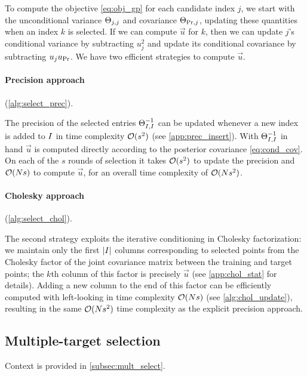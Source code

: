 \documentclass[review,supplement,onefignum,onetabnum]{siamonline220329}
\begin{document}
To compute the objective \cref{eq:obj_gp} for each candidate index \( j \),
we start with the unconditional variance \( \Theta_{j, j} \) and covariance \(
\Theta_{\text{Pr}, j} \), updating these quantities when an index \( k \) is selected.
If we can compute \( \vec{u} \) for \( k \), then we can update
\( j \)'s conditional variance by subtracting \( u_j^2 \) and
update its conditional covariance by subtracting \( u_j u_{\text{Pr}} \).
We have two efficient strategies to compute \( \vec{u} \).

\paragraph{Precision approach}
(\cref{alg:select_prec}).

The precision of the selected entries \( \Theta_{I, I}^{-1} \)
can be updated whenever a new index is added to \( I \) in
time complexity \( \mathcal{O}(s^2) \) (see \cref{app:prec_insert}).
With \( \Theta_{I, I}^{-1} \) in hand \( \vec{u} \) is computed
directly according to the posterior covariance \cref{eq:cond_cov}.
On each of the \( s \) rounds of selection it takes \( \mathcal{O}(s^2)
\) to update the precision and \( \mathcal{O}(Ns) \) to compute \(
\vec{u} \), for an overall time complexity of \( \mathcal{O}(N s^2) \).

\paragraph{Cholesky approach}
(\cref{alg:select_chol}).

The second strategy exploits the iterative conditioning in Cholesky
factorization: we maintain only the first \( \lvert I\rvert \) columns corresponding
to selected points from the Cholesky factor of the joint covariance matrix
between the training and target points; the \( k \)th column of this factor
is precisely \( \vec{u} \) (see \cref{app:chol_stat} for details).
Adding a new column to the end of this factor can
be efficiently computed with left-looking in time complexity \( \mathcal{O}(N s) \)
(see \cref{alg:chol_update}), resulting in the same \( \mathcal{O}(N s^2) \) time
complexity as the explicit precision approach.

\subsection{Multiple-target selection}
\label{app:mult_select}

Context is provided in \cref{subsec:mult_select}.
\end{document}
